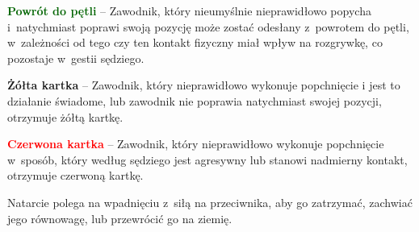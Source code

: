 \documentclass[12pt,a4paper]{article}
\renewcommand{\paragraph}[1]{
  \oldparagraph{#1}%
  \leftskip2cm
}
\newcommand\redcard[1]{\bgroup\textcolor{red}{\textbf{#1}}}
\newcommand\yellowcard[1]{\bgroup\textcolor{darkyellow}{\textbf{#1}}}
\newcommand\other[1]{\bgroup\textcolor{darkgreen}{\textbf{#1}}}
\begin{document}
\other{Powrót do pętli} -- Zawodnik, który nieumyślnie nieprawidłowo
popycha i~natychmiast poprawi swoją pozycję może zostać odesłany z~powrotem do pętli, w~zależności od tego czy ten kontakt fizyczny miał
wpływ na rozgrywkę, co pozostaje w~gestii sędziego.

\yellowcard{Żółta kartka} -- Zawodnik, który nieprawidłowo wykonuje popchnięcie
i jest to działanie świadome, lub zawodnik nie poprawia natychmiast
swojej pozycji, otrzymuje żółtą kartkę.

\redcard{Czerwona kartka} -- Zawodnik, który nieprawidłowo wykonuje
popchnięcie w~sposób, który według sędziego jest agresywny lub stanowi
nadmierny kontakt, otrzymuje czerwoną kartkę.

\paragraph{Natarcie}
Natarcie polega na wpadnięciu z~siłą na
przeciwnika, aby go zatrzymać, zachwiać jego równowagę, lub przewrócić
go na ziemię.
\end{document}
